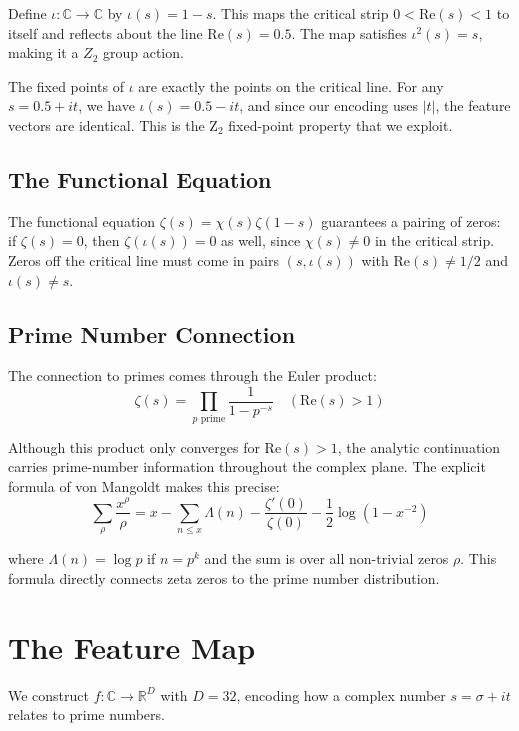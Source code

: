 \documentclass[11pt]{article}
\begin{document}
Define $\iota: \mathbb{C} \to \mathbb{C}$ by $\iota(s) = 1 - s$. This maps the critical strip $0 < \mathrm{Re}(s) < 1$ to itself and reflects about the line $\mathrm{Re}(s) = 0.5$. The map satisfies $\iota^2(s) = s$, making it a $Z_2$ group action.

The fixed points of $\iota$ are exactly the points on the critical line. For any $s = 0.5 + it$, we have $\iota(s) = 0.5 - it$, and since our encoding uses $|t|$, the feature vectors are identical. This is the Z$_2$ fixed-point property that we exploit.

\subsection{The Functional Equation}

The functional equation $\zeta(s) = \chi(s)\zeta(1-s)$ guarantees a pairing of zeros: if $\zeta(s) = 0$, then $\zeta(\iota(s)) = 0$ as well, since $\chi(s) \neq 0$ in the critical strip. Zeros off the critical line must come in pairs $(s, \iota(s))$ with $\mathrm{Re}(s) \neq 1/2$ and $\iota(s) \neq s$.

\subsection{Prime Number Connection}

The connection to primes comes through the Euler product:
$$\zeta(s) = \prod_{p \text{ prime}} \frac{1}{1 - p^{-s}} \quad (\mathrm{Re}(s) > 1)$$

Although this product only converges for $\mathrm{Re}(s) > 1$, the analytic continuation carries prime-number information throughout the complex plane. The explicit formula of von Mangoldt makes this precise:
$$\sum_{\rho} \frac{x^\rho}{\rho} = x - \sum_{n \le x} \Lambda(n) - \frac{\zeta'(0)}{\zeta(0)} - \frac{1}{2}\log(1-x^{-2})$$

where $\Lambda(n) = \log p$ if $n = p^k$ and the sum is over all non-trivial zeros $\rho$. This formula directly connects zeta zeros to the prime number distribution.

\section{The Feature Map}

We construct $f: \mathbb{C} \to \mathbb{R}^{D}$ with $D=32$, encoding how a complex number $s = \sigma + it$ relates to prime numbers.
\end{document}
